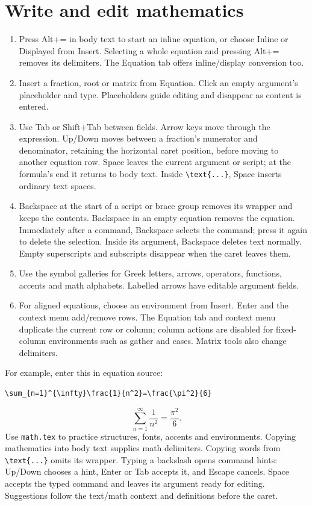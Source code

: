 \documentclass[11pt]{article}
\begin{document}
\section{Write and edit mathematics}
\begin{enumerate}
\item Press Alt+= in body text to start an inline equation, or choose Inline or
Displayed from Insert. Selecting a whole equation and pressing Alt+= removes
its delimiters. The Equation tab offers inline/display conversion too.
\item Insert a fraction, root or matrix from Equation. Click an empty argument's
placeholder and type. Placeholders guide editing and disappear as content is entered.
\item Use Tab or Shift+Tab between fields. Arrow keys move through the expression.
Up/Down moves between a fraction's numerator and denominator, retaining the
horizontal caret position, before moving to another equation row.
Space leaves the current argument or script; at the formula's end it returns to
body text. Inside \verb|\text{...}|, Space inserts ordinary text spaces.
\item Backspace at the start of a script or brace group removes its wrapper and
keeps the contents. Backspace in an empty equation removes the equation.
Immediately after a command, Backspace selects the command; press it again to
delete the selection. Inside its argument, Backspace deletes text normally.
Empty superscripts and subscripts disappear when the caret leaves them.
\item Use the symbol galleries for Greek letters, arrows, operators, functions,
accents and math alphabets. Labelled arrows have editable argument fields.
\item For aligned equations, choose an environment from Insert. Enter and the
context menu add/remove rows. The Equation tab and context menu duplicate the
current row or column; column actions are disabled for fixed-column environments
such as gather and cases. Matrix tools also change delimiters.
\end{enumerate}

For example, enter this in equation source:
\begin{verbatim}
\sum_{n=1}^{\infty}\frac{1}{n^2}=\frac{\pi^2}{6}
\end{verbatim}
\begin{equation}\label{eq:guide}
\sum_{n=1}^{\infty}\frac{1}{n^2}=\frac{\pi^2}{6}.
\end{equation}
Use \texttt{math.tex} to practice structures, fonts, accents and environments.
Copying mathematics into body text supplies math delimiters. Copying words from
\verb|\text{...}| omits its wrapper. Typing a backslash opens command hints:
Up/Down chooses a hint, Enter or Tab accepts it, and Escape cancels. Space accepts
the typed command and leaves its argument ready for editing.
Suggestions follow the text/math context and definitions before the caret.
\end{document}
